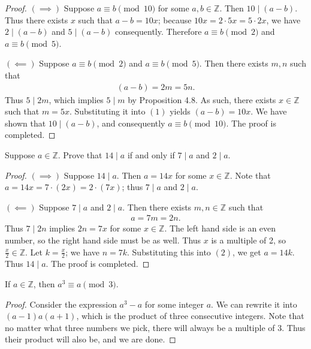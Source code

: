 \documentclass{exam}
\begin{document}
\begin{proof}
    $(\implies)$ Suppose $a\equiv b\pmod{10}$ for some $a, b\in\mathbb Z$. Then $10\mid (a-b)$. Thus there exists $x$ such that
    $a-b=10x$; because $10x = 2\cdot5x = 5\cdot2x$, we have $2\mid(a-b)$ and $5\mid(a-b)$ consequently. Therefore $a\equiv b\pmod2$ and $a\equiv b\pmod5$.

    $(\impliedby)$ Suppose $a\equiv b\pmod 2$ and $a\equiv b\pmod 5$. Then there exists $m,n$ such that 
    \begin{gather}
        (a-b) = 2m = 5n.
    \end{gather}
    Thus $5 \mid 2m$, which implies $5\mid m$ by Proposition 4.8. As such, there exists $x\in\mathbb Z$ such that $m = 5x$. Substituting it into $(1)$ yields $(a-b)=10x$. We have shown that $10\mid(a-b)$, and consequently $a\equiv b\pmod{10}$. The proof is completed.
\end{proof}

\begin{proposition}{7.9}
    Suppose $a\in\mathbb Z$. Prove that $14\mid a$ if and only if $7\mid a$ and $2\mid a$.
\end{proposition}

\begin{proof}
    $(\implies)$ Suppose $14\mid a$. Then $a = 14x$ for some $x\in\mathbb Z$. Note that $a = 14x = 7\cdot(2x) = 2\cdot(7x)$; thus $7\mid a$ and $2\mid a$.

    $(\impliedby)$ Suppose $7\mid a$ and $2\mid a$. Then there exists $m, n\in\mathbb Z$ such that
    \begin{align}
        a = 7m = 2n.
    \end{align}
    Thus $7\mid 2n$ implies $2n = 7x$ for some $x\in\mathbb Z$. The left hand side is an even number, so the right hand side must be as well. Thus $x$ is a multiple of 2, so $\frac{x}2\in\mathbb Z$. Let $k = \frac{x}2$; we have $n = 7k$. Substituting this into $(2)$, we get $a = 14k$. Thus $14 \mid a$. The proof is completed.
\end{proof}

\begin{proposition}{7.10}
    If $a\in\mathbb Z$, then $a^3\equiv a\pmod3$.
\end{proposition}

\begin{proof}
    Consider the expression $a^3 - a$ for some integer $a$. We can rewrite it into $(a-1)a(a+1)$, which is the product of three consecutive integers. Note that no matter what three numbers we pick, there will always be a multiple of 3. Thus their product will also be, and we are done.
\end{proof}
\end{document}

